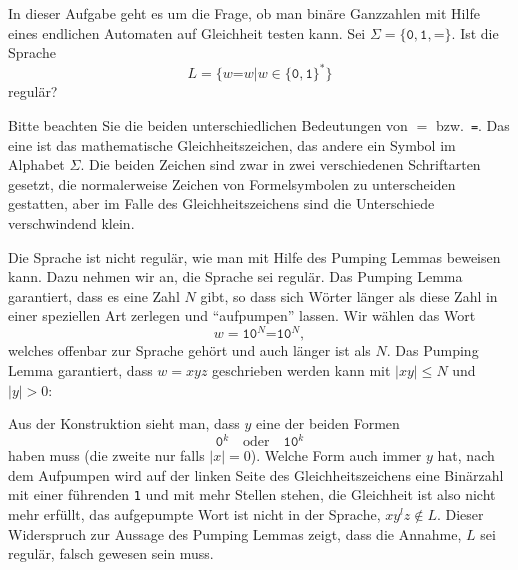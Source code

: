 In dieser Aufgabe geht es um die Frage, ob man binäre Ganzzahlen mit
Hilfe eines endlichen Automaten auf Gleichheit testen kann.
Sei $\Sigma=\{\texttt{0},\texttt{1},\texttt{=}\}$. Ist die Sprache
\[
L=\{ w\texttt{=}w|w\in \{\texttt{0},\texttt{1}\}^*\}
\]
regulär?

\begin{hinweis}
Bitte beachten Sie die beiden unterschiedlichen Bedeutungen von $=$
bzw.~\texttt{=}.
Das eine ist das mathematische Gleichheitszeichen, das andere ein Symbol
im Alphabet $\Sigma$.
Die beiden Zeichen sind zwar in zwei verschiedenen Schriftarten gesetzt,
die normalerweise Zeichen von Formelsymbolen zu unterscheiden gestatten,
aber im Falle des Gleichheitszeichens sind die Unterschiede verschwindend
klein.
\end{hinweis}

\begin{loesung}
Die Sprache ist nicht regulär, wie man mit Hilfe des Pumping
Lemmas beweisen kann.
Dazu nehmen wir an, die Sprache sei regulär.
Das Pumping Lemma garantiert, dass es eine Zahl $N$ gibt, so dass
sich Wörter länger als diese Zahl in einer speziellen Art
zerlegen und ``aufpumpen'' lassen.
Wir wählen das Wort
\[
w=\texttt{10}^N\texttt{=10}^N,
\]
welches offenbar zur Sprache gehört und auch länger ist als $N$.
Das Pumping Lemma garantiert, dass $w=xyz$  geschrieben werden kann
mit $|xy|\le N$ und $|y|>0$:
\begin{center}
\end{center}
Aus der Konstruktion sieht man, dass $y$ eine der beiden Formen
\[
\texttt{0}^k
\quad\text{oder}\quad
\texttt{10}^k
\]
haben muss (die zweite nur falls $|x|=0$).
Welche Form auch immer $y$ hat, nach dem Aufpumpen wird
auf der linken Seite des Gleichheitszeichens eine Binärzahl mit
einer führenden \texttt{1} und mit mehr Stellen stehen, die Gleichheit
ist also nicht mehr erfüllt, das aufgepumpte Wort ist nicht in der
Sprache, $xy^lz\not\in L$.
Dieser Widerspruch zur Aussage des Pumping
Lemmas zeigt, dass die Annahme, $L$ sei regulär, falsch gewesen
sein muss.
\end{loesung}


